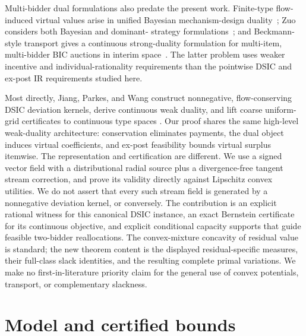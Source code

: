 \documentclass[11pt]{article}
\begin{document}
Multi-bidder dual formulations also predate the present work.  Finite-type
flow-induced virtual values arise in unified Bayesian mechanism-design
duality~\citep{cai2018duality}; Zuo considers both Bayesian and dominant-
strategy formulations~\citep{zuo2017}; and Beckmann-style transport gives a
continuous strong-duality formulation for multi-item, multi-bidder BIC
auctions in interim space~\citep{kolesnikov2022beckmann}.  The latter problem
uses weaker incentive and individual-rationality requirements than the
pointwise DSIC and ex-post IR requirements studied here.

Most directly, Jiang, Parkes, and Wang construct nonnegative, flow-conserving
DSIC deviation kernels, derive continuous weak duality, and lift coarse
uniform-grid certificates to continuous type spaces
\citep{jiang2026duality}.  Our proof shares the same high-level weak-duality
architecture: conservation eliminates payments, the dual object induces
virtual coefficients, and ex-post feasibility bounds virtual surplus
itemwise.  The representation and certification are different.  We use a
signed vector field with a distributional radial source plus a
divergence-free tangent stream correction, and prove its validity directly
against Lipschitz convex utilities.  We do not assert that every such stream
field is generated by a nonnegative deviation kernel, or conversely.  The
contribution is an explicit rational witness for this canonical DSIC instance,
an exact Bernstein certificate for its continuous objective, and explicit
conditional capacity supports that guide feasible two-bidder reallocations.
The convex-mixture concavity of residual value is standard;
the new theorem content is the displayed residual-specific measures, their
full-class slack identities, and the resulting complete primal variations.
We make no first-in-literature priority claim for the general use of convex
potentials, transport, or complementary slackness.

\section{Model and certified bounds}\label{sec:model}
\end{document}
